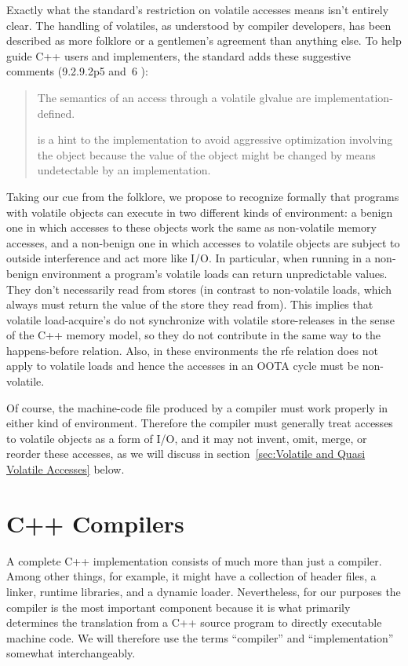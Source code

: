 \documentclass[10]{article}
\begin{document}
Exactly what the standard's restriction on volatile accesses means
isn't entirely clear.
The handling of volatiles, as understood by compiler developers, has
been described as more folklore or a gentlemen's agreement than
anything else.
To help guide C++ users and implementers, the standard adds these
suggestive comments (9.2.9.2p5 and~6 ):
\begin{quote}
	The semantics of an access through a volatile glvalue are
	implementation-defined.

	 is a hint to the implementation to avoid aggressive
	optimization involving the object because the value of the object
	might be changed by means undetectable by an implementation.
\end{quote}

Taking our cue from the folklore, we propose to recognize formally
that programs with volatile objects can execute in two different kinds
of environment: a benign one in which accesses to these objects work
the same as non-volatile memory accesses, and a non-benign one in which
accesses to volatile objects are subject to outside interference and
act more like I/O.
In particular, when running in a non-benign environment a program's
volatile loads can return unpredictable values.
They don't necessarily read from stores (in contrast to non-volatile loads,
which always must return the value of the store they read from).
This implies that volatile load-acquire's do not synchronize with
volatile store-releases in the sense of the C++ memory model,
so they do not contribute in the same way to the happens-before relation.
Also, in these environments the rfe relation does not apply
to volatile loads and hence the accesses in an OOTA cycle must be
non-volatile.

Of course, the machine-code file produced by a compiler must work
properly in either kind of environment.
Therefore the compiler must generally treat accesses to volatile objects
as a form of I/O, and it may not
invent, omit, merge, or reorder these accesses, as we will discuss in
section~\ref{sec:Volatile and Quasi Volatile Accesses} below.

\section{C++ Compilers}
\label{sec:C++ Compilers}

A complete C++ implementation consists of much more than just a compiler.
Among other things, for example, it might have a collection of
 header files, a linker, runtime libraries, and a dynamic loader.
Nevertheless, for our purposes the compiler is the most important
component because it is what primarily determines the translation from
a C++ source program to directly executable machine code.
We will therefore use the terms ``compiler'' and ``implementation''
somewhat interchangeably.
\end{document}

